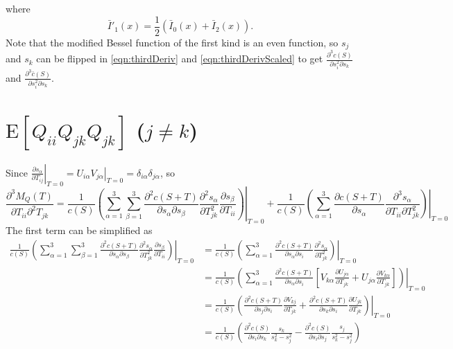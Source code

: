 \documentclass[10pt]{article}
\newcommand{\expect}[1]{\ensuremath{\mathrm{E}\left[ #1 \right]}}
\begin{document}
where 
\begin{equation}
	\bar{I}'_1(x) = \frac{1}{2}(\bar{I}_0(x)+\bar{I}_2(x)).
\end{equation}
Note that the modified Bessel function of the first kind is an even function, so $s_j$ and $s_k$ can be flipped in \eqref{eqn:thirdDeriv} and \eqref{eqn:thirdDerivScaled} to get $\frac{\partial^3 c(S)}{\partial s_i^2 \partial s_k}$ and $\frac{\partial^3 \bar{c}(S)}{\partial s_i^2 \partial s_k}$.

\section{$\expect{Q_{ii}Q_{jk}Q_{jk}}$ ($j\neq k$)}

Since $\left.\frac{\partial s_\alpha}{\partial T_{ij}}\right|_{T=0} = \left.U_{i\alpha}V_{j\alpha}\right|_{T=0} = \delta_{i\alpha}\delta_{j\alpha}$, so
\begin{equation}
	\frac{\partial^3 M_Q(T)}{\partial T_{ii} \partial^2 T_{jk}} = \frac{1}{c(S)}\left.\left( \sum_{\alpha=1}^3\sum_{\beta=1}^3 \frac{\partial^2 c(S+T)}{\partial s_\alpha \partial s_\beta} \frac{\partial^2 s_\alpha}{\partial T_{jk}^2} \frac{\partial s_\beta}{\partial T_{ii}} \right)\right|_{T=0} + \frac{1}{c(S)}\left.\left( \sum_{\alpha=1}^3 \frac{\partial c(S+T)}{\partial s_\alpha} \frac{\partial^3 s_\alpha}{\partial T_{ii}\partial T^2_{jk}} \right)\right|_{T=0}
\end{equation}
The first term can be simplified as
\begin{align}
	\frac{1}{c(S)}\left.\left( \sum_{\alpha=1}^3\sum_{\beta=1}^3 \frac{\partial^2 c(S+T)}{\partial s_\alpha \partial s_\beta} \frac{\partial^2 s_\alpha}{\partial T_{jk}^2} \frac{\partial s_\beta}{\partial T_{ii}} \right)\right|_{T=0} &= \frac{1}{c(S)}\left.\left( \sum_{\alpha=1}^3 \frac{\partial^2 c(S+T)}{\partial s_\alpha \partial s_i} \frac{\partial^2 s_\alpha}{\partial T_{jk}^2} \right)\right|_{T=0} \nonumber \\
	&= \frac{1}{c(S)}\left.\left( \sum_{\alpha=1}^3 \frac{\partial^2 c(S+T)}{\partial s_\alpha \partial s_i} \left[ V_{k\alpha}\frac{\partial U_{j\alpha}}{\partial T_{jk}} + U_{j\alpha}\frac{\partial V_{k\alpha}}{\partial T_{jk}} \right] \right)\right|_{T=0} \nonumber \\
	&= \frac{1}{c(S)} \left.\left( \frac{\partial^2 c(S+T)}{\partial s_j \partial s_i} \frac{\partial V_{kj}}{\partial T_{jk}} + \frac{\partial^2 c(S+T)}{\partial s_k \partial s_i} \frac{\partial U_{jk}}{\partial T_{jk}} \right)\right|_{T=0} \nonumber \\
	&= \frac{1}{c(S)} \left( \frac{\partial^2 c(S)}{\partial s_i \partial s_k} \frac{s_k}{s_k^2-s_j^2} - \frac{\partial^2 c(S)}{\partial s_i \partial s_j} \frac{s_j}{s_k^2-s_j^2} \right)
\end{align}
\end{document}
